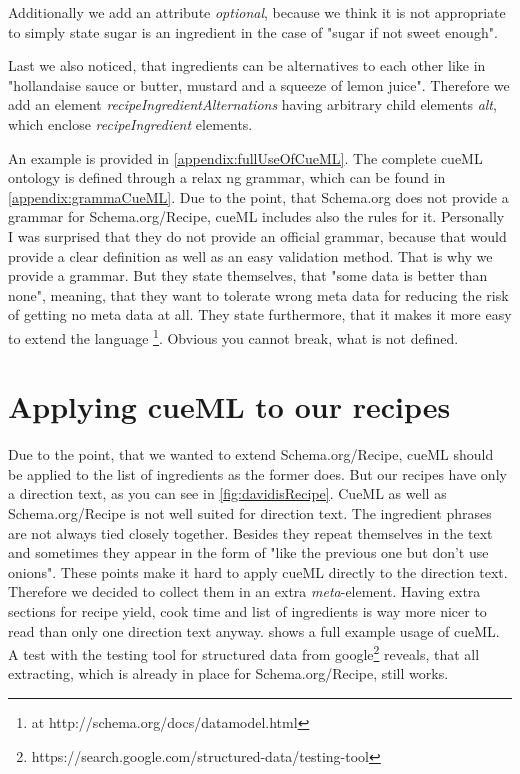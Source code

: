 \documentclass[12pt, twoside]{report}
\begin{document}
Additionally we add an attribute \textit{optional}, because we think it is not appropriate to simply state sugar is an ingredient in the case of "sugar if not sweet enough".  

Last we also noticed, that ingredients can be alternatives to each other like in "hollandaise sauce or butter, mustard and a squeeze of lemon juice". Therefore we add an element \textit{recipeIngredientAlternations} having arbitrary child elements \textit{alt}, which enclose \textit{recipeIngredient} elements.

An example is provided in \cref{appendix:fullUseOfCueML}. The complete cueML ontology is defined through a relax ng grammar, which can be found in \cref{appendix:grammaCueML}. Due to the point, that Schema.org does not provide a grammar for Schema.org/Recipe, cueML includes also the rules for it. Personally I was surprised that they do not provide an official grammar, because that would provide a clear definition as well as an easy validation method. That is why we provide a grammar. But they state themselves, that "some data is better than none", meaning, that they want to tolerate wrong meta data for reducing the risk of getting no meta data at all. They state furthermore, that it makes it more easy to extend the language \parencite{schemaOrg}\footnote{at http://schema.org/docs/datamodel.html}. Obvious you cannot break, what is not defined. 


\section{Applying cueML to our recipes}
Due to the point, that we wanted to extend Schema.org/Recipe, cueML should be applied to the list of ingredients as the former does. But our recipes have only a direction text, as you can see in \cref{fig:davidisRecipe}. CueML as well as Schema.org/Recipe is not well suited for direction text. The ingredient phrases are not always tied closely together. Besides they repeat themselves in the text and sometimes they appear in the form of "like the previous one but don't use onions". These points make it hard to apply cueML directly to the direction text. Therefore we decided to collect them in an extra \textit{meta}-element. Having extra sections for recipe yield, cook time and list of ingredients is way more nicer to read than only one direction text anyway.  shows a full example usage of cueML. A test with the testing tool for structured data from google\footnote{https://search.google.com/structured-data/testing-tool} reveals, that all extracting, which is already in place for Schema.org/Recipe, still works. 
\end{document}
